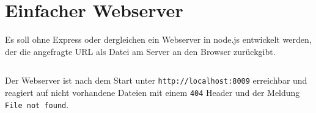 \documentclass{school}
\begin{document}
\newpage
\section{Einfacher Webserver}
Es soll ohne Express oder dergleichen ein Webserver in node.js entwickelt werden, der die angefragte URL als Datei am Server an den Browser zurückgibt.

\inputminted{javascript}{3-webserver/webserver.js}

Der Webserver ist nach dem Start unter \texttt{http://localhost:8009} erreichbar und reagiert auf nicht vorhandene Dateien mit einem \texttt{404} Header und der Meldung \texttt{File not found}.

\inputminted{bash}{3-webserver/sample.txt}



\end{document}
